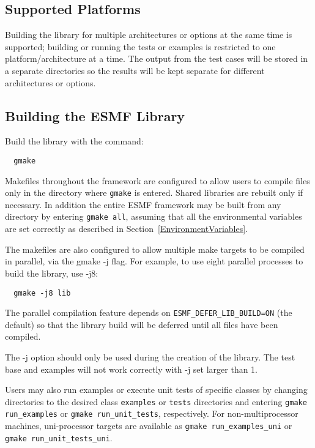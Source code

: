 \subsection{Supported Platforms}


Building the library for multiple architectures or options at the same
time is supported; building or running the tests or examples is restricted
to one platform/architecture at a time.  The output from the test cases
will be stored in a separate directories so the results will be kept
separate for different architectures or options.

\subsection{Building the ESMF Library}
\label{BuildESMF}



Build the library with the command:
\begin{verbatim}
  gmake
\end{verbatim}


Makefiles throughout the framework are configured to allow users to
compile files only in the directory where {\tt gmake} is entered. Shared
libraries are rebuilt only if necessary. In addition the entire ESMF
framework may be built from any directory by entering {\tt gmake all},
assuming that all the environmental variables are set correctly as
described in Section~\ref{EnvironmentVariables}.

The makefiles are also configured to allow multiple make targets to be
compiled in parallel, via the gmake -j flag.  For example, to use eight
parallel processes to build the library, use -j8:
\begin{verbatim}
  gmake -j8 lib
\end{verbatim}

The parallel compilation feature depends on {\tt ESMF\_DEFER\_LIB\_BUILD=ON}
(the default) so that the library build will be deferred until all files
have been compiled.

The -j option should only be used during the creation of the library.
The test base and examples will not work correctly with -j set larger
than 1.

Users may also run examples or execute unit tests of specific classes
by changing directories to the desired class {\tt examples} or {\tt tests}
directories and entering {\tt gmake run\_examples} or
{\tt gmake run\_unit\_tests}, respectively.  For non-multiprocessor machines,
uni-processor targets are available as {\tt gmake run\_examples\_uni} or
{\tt gmake run\_unit\_tests\_uni}.

